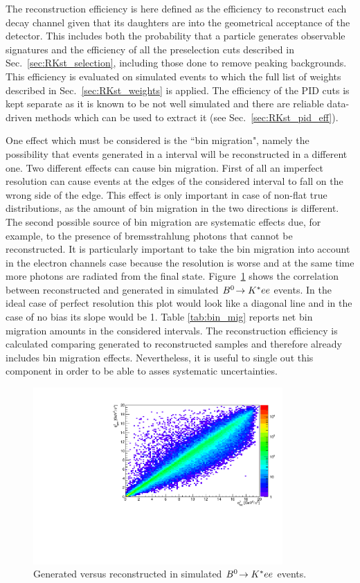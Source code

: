The reconstruction efficiency is here defined as the efficiency to reconstruct
each decay channel given that its daughters are into the geometrical acceptance
of the detector. This includes both the probability that a particle generates
observable signatures and the efficiency of all the preselection cuts described in Sec.~\ref{sec:RKst_selection},
including those done to remove peaking backgrounds. This efficiency is evaluated on simulated events
to which the full list of weights described in Sec.~\ref{sec:RKst_weights} is applied.
The efficiency of the PID cuts is kept separate as it is known to be not well simulated
and there are reliable data-driven methods which can be used to extract it (see Sec.~\ref{sec:RKst_pid_eff}).

One effect which must be considered is the ``bin migration", namely the possibility
that events generated in a \qsq interval will be reconstructed in a different one.
Two different effects can cause bin migration. First of all an imperfect resolution
can cause events at the edges of the considered interval to fall on the wrong side of the edge.
This effect is only important in case of non-flat true distributions, as the amount of bin migration
in the two directions is different.
The second possible source of bin migration are systematic effects due, for example,
to the presence of bremsstrahlung photons that cannot be reconstructed.
It is particularly important to take the bin migration into account in the electron channels case 
because the \qsq resolution is worse and at the same time more photons are radiated from the final state.
Figure~\ref{fig:ee_bin_mig} shows the correlation between reconstructed and generated \qsq
in simulated ${{B}^0}\!\rightarrow {\ensuremath{{K}^*}} ee$ events. In the ideal case of perfect resolution this plot
would look like a diagonal line and in the case of no bias its slope would be 1.
Table \ref{tab:bin_mig} reports net bin migration amounts in the considered \qsq intervals.
The reconstruction efficiency is calculated comparing generated to reconstructed samples
and therefore already includes bin migration effects. Nevertheless, it is useful to single
out this component in order to be able to asses systematic uncertainties.

\begin{figure}[h!]
\centering
\includegraphics[width=0.85\textwidth]{RKst/figs/bin_mig.pdf}
\caption{Generated versus reconstructed \qsq in simulated ${{B}^0}\!\rightarrow {\ensuremath{{K}^*}} ee$ events.}
\label{fig:ee_bin_mig}
\end{figure}

